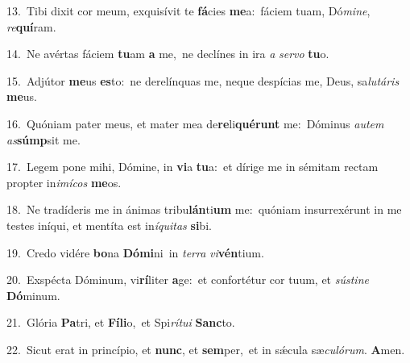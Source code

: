 {\numbfont\textcolor{\numbcolor}{13.}}~Tibi dixit cor meum, exquisívit te \textbf{fá}\-cies \textbf{me}\-a:~\star fáciem tuam, Dó\-\textit{mi}\-\textit{ne}, \textit{re}\-\textbf{quí}ram.\par
{\numbfont\textcolor{\numbcolor}{14.}}~Ne avértas fáciem \textbf{tu}\-am \textbf{a} me,~\star ne declínes in ira \textit{a} \textit{ser}\-\textit{vo} \textbf{tu}\-o.\par
{\numbfont\textcolor{\numbcolor}{15.}}~Adjútor \textbf{me}\-us \textbf{es}\-to:~\star ne derelínquas me, neque despícias me, Deus, sa\-\textit{lu}\-\textit{tá}\textit{ris} \textbf{me}\-us.\par
{\numbfont\textcolor{\numbcolor}{16.}}~Quóniam pater meus, et mater mea de\-\textbf{re}\-li\-\textbf{qué}\-\textbf{runt} me:~\star Dóminus \textit{au}\-\textit{tem} \textit{as}\-\textbf{súmp}sit me.\par
{\numbfont\textcolor{\numbcolor}{17.}}~Legem pone mihi, Dómine, in \textbf{vi}\-a \textbf{tu}\-a:~\star et dírige me in sémitam rectam propter in\-\textit{i}\-\textit{mí}\textit{cos} \textbf{me}\-os.\par
{\numbfont\textcolor{\numbcolor}{18.}}~Ne tradíderis me in ánimas tribu\-\textbf{lán}\-ti\textbf{um} me:~\star quóniam insurrexérunt in me testes iníqui, et mentíta est in\-\textit{í}\-\textit{qui}\textit{tas} \textbf{si}\-bi.\par
{\numbfont\textcolor{\numbcolor}{19.}}~Credo vidére \textbf{bo}\-na \textbf{Dó}\-\textbf{mi}ni~\star in \textit{ter}\-\textit{ra} \textit{vi}\-\textbf{vén}tium.\par
{\numbfont\textcolor{\numbcolor}{20.}}~Exspécta Dóminum, vi\-\textbf{rí}\-liter \textbf{a}\-ge:~\star et confortétur cor tuum, et \textit{sús}\-\textit{ti}\textit{ne} \textbf{Dó}\-minum.\par
{\numbfont\textcolor{\numbcolor}{21.}}~Glória \textbf{Pa}\-tri, et \textbf{Fí}\-\textbf{li}o,~\star et Spi\-\textit{rí}\-\textit{tu}\textit{i} \textbf{Sanc}\-to.\par
{\numbfont\textcolor{\numbcolor}{22.}}~Sicut erat in princípio, et \textbf{nunc}\-, et \textbf{sem}\-per,~\star et in sǽcula sæ\-\textit{cu}\-\textit{ló}\textit{rum}. \textbf{A}\-men.\par
